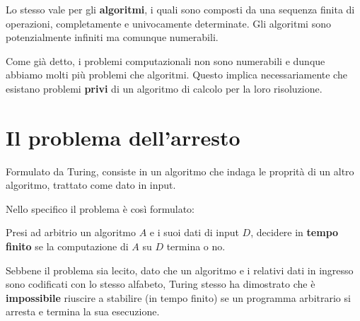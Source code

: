 Lo stesso vale per gli \textbf{algoritmi}, i quali sono composti da una sequenza finita di operazioni, completamente
e univocamente determinate. Gli algoritmi sono potenzialmente infiniti ma comunque numerabili.

Come gi\`a detto, i problemi computazionali non sono numerabili e dunque abbiamo molti pi\`u problemi che algoritmi.
Questo implica necessariamente che esistano problemi \textbf{privi} di un algoritmo di calcolo per la loro risoluzione.

\section{Il problema dell'arresto}
Formulato da Turing, consiste in un algoritmo che indaga le proprit\`a di un altro algoritmo, trattato come dato in
input.

Nello specifico il problema \`e cos\`i formulato:
\begin{center}
	Presi ad arbitrio un algoritmo $A$ e i suoi dati di input $D$, decidere in \textbf{tempo finito} se la computazione
	di $A$ su $D$ termina o no.
\end{center}

Sebbene il problema sia lecito, dato che un algoritmo e i relativi dati in ingresso sono codificati con lo stesso
alfabeto, Turing stesso ha dimostrato che \`e \textbf{impossibile} riuscire a stabilire (in tempo finito) se un
programma arbitrario si arresta e termina la sua esecuzione.

